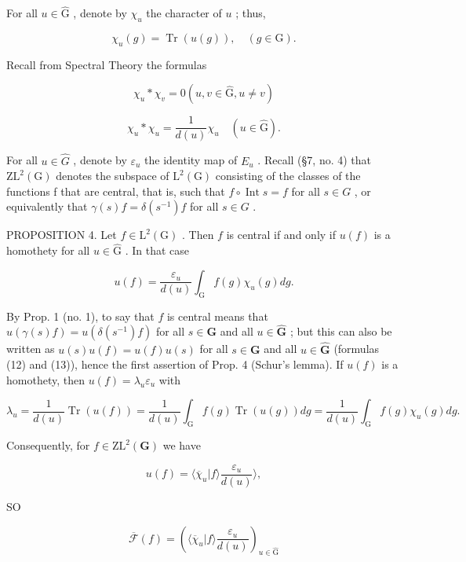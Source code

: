 For all \(u \in \hat{\mathrm{G}}\) , denote by \(\chi_u\) the character of \(u\) ; thus,

\[
\chi_ {u} (g) = \operatorname{Tr} (u (g)), \quad (g \in \mathrm{G}).\tag{16}
\]

Recall from Spectral Theory the formulas

\[
\chi_ {u} * \chi_ {v} = 0 (u, v \in \hat {\mathrm{G}}, u \neq v)\tag{17}
\]

\[
\chi_ {u} * \chi_ {u} = \frac {1}{d (u)} \chi_ {u} \quad (u \in \hat {\mathrm{G}}).\tag{18}
\]

For all \(u \in \hat{G}\) , denote by \(\varepsilon_{u}\) the identity map of \(E_{u}\) . Recall (§7, no. 4) that \(\mathrm{ZL}^{2}(\mathrm{G})\) denotes the subspace of \(\mathrm{L}^{2}(\mathrm{G})\) consisting of the classes of the functions f that are central, that is, such that \(f \circ \operatorname{Int}s = f\) for all \(s \in G\) , or equivalently that \(\gamma(s)f = \delta(s^{-1})f\) for all \(s \in G\) .

PROPOSITION 4. Let \(f \in \mathrm{L}^2(\mathrm{G})\) . Then \(f\) is central if and only if \(u(f)\) is a homothety for all \(u \in \hat{\mathrm{G}}\) . In that case

\[
u (f) = \frac {\varepsilon_ {u}}{d (u)} \int_ {\mathrm{G}} f (g) \chi_ {u} (g) d g.\tag{19}
\]

By Prop. 1 (no. 1), to say that \(f\) is central means that \(u(\gamma(s)f) = u(\delta(s^{-1})f)\) for all \(s \in \mathbf{G}\) and all \(u \in \hat{\mathbf{G}}\) ; but this can also be written as \(u(s)u(f) = u(f)u(s)\) for all \(s \in \mathbf{G}\) and all \(u \in \hat{\mathbf{G}}\) (formulas (12) and (13)), hence the first assertion of Prop. 4 (Schur's lemma). If \(u(f)\) is a homothety, then \(u(f) = \lambda_u\varepsilon_u\) with

\[
\lambda_ {u} = \frac {1}{d (u)} \operatorname{Tr} (u (f)) = \frac {1}{d (u)} \int_ {\mathrm{G}} f (g) \operatorname{Tr} (u (g)) d g = \frac {1}{d (u)} \int_ {\mathrm{G}} f (g) \chi_ {u} (g) d g.
\]

Consequently, for \(f \in \mathrm{ZL}^2(\mathbf{G})\) we have

\[
u (f) = \langle \overline {{\chi}} _ {u} | f \rangle \frac {\varepsilon_ {u}}{d (u)} \rangle ,\tag{20}
\]

SO

\[
\overline {{{{\mathcal {F}}}}} (f) = \left(\langle \overline {{{{\chi}}}} _ {u} | f \rangle \frac {\varepsilon_ {u}}{d (u)}\right) _ {u \in \hat {\mathrm{G}}}\tag{21}
\]

